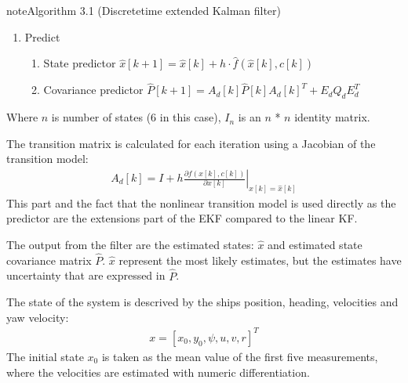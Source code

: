 \documentclass[review]{elsarticle}
\begin{document}
\begin{sphinxadmonition}{note}{Algorithm 3.1 (Discrete\sphinxhyphen{}time extended Kalman filter)}
\begin{enumerate}
\begin{enumerate}
\item {} 
\sphinxAtStartPar
Predict
\begin{enumerate}
%
\item {} 
\sphinxAtStartPar
State predictor
\(\hat{x}[k+1] = \hat{x}[k] + h \cdot \hat{f}(\hat{x}[k], c[k])\)

\item {} 
\sphinxAtStartPar
Covariance predictor
\(\hat{P}[k+1] = A_d[k]  \hat{P}[k] A_d[k]^T + E_d Q_d E_d^T \)

\end{enumerate}

\end{enumerate}

\end{enumerate}
\end{sphinxadmonition}

\sphinxAtStartPar
Where \(n\) is number of states (6 in this case), \(I_n\) is an \(n\) * \(n\) identity matrix.

\sphinxAtStartPar
The transition matrix is calculated for each iteration using a Jacobian of the transition model:
\begin{equation}\label{equation:04.01_EK:eqjacobi}
\begin{split}A_d[k] = I + h \left. \frac{\partial f \left(x[k],c[k] \right)}{\partial x[k]} \right|_{x[k]=\hat{x}[k]}\end{split}
\end{equation}
\sphinxAtStartPar
This part and the fact that the nonlinear transition model is used directly as the predictor are the extensions part of the EKF compared to the linear KF.

\sphinxAtStartPar
The output from the filter are the estimated states: \(\hat{x}\) and estimated state covariance matrix \(\hat{P}\). \(\hat{x}\) represent the most likely estimates, but the estimates have uncertainty that are expressed in \(\hat{P}\).

\sphinxAtStartPar
The state of the system is descrived by the ships position, heading, velocities and yaw velocity:
\begin{equation}\label{equation:04.01_EK:eqstates}
\begin{split}x = [x_0,y_0,\psi,u,v,r]^T\end{split}
\end{equation}
\sphinxAtStartPar
The initial state \(x_0\) is taken as the mean value of the first five measurements, where the velocities are estimated with numeric differentiation.
\end{document}
